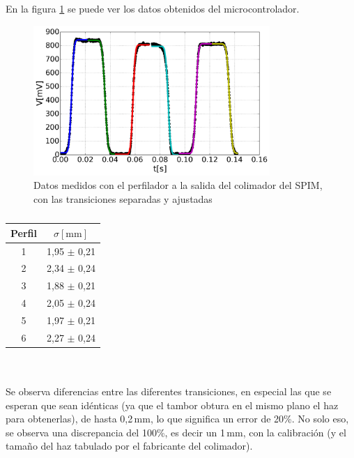 En la figura \ref{fig:perfilador/preliminar_fit} se puede ver los datos obtenidos del microcontrolador.

\begin{minipage}[c]{0.55\textwidth}
\begin{figure}[H]
    \centering
    \includegraphics[width=0.8\textwidth]{fig/perfilador/preliminar_fit}
    \caption{Datos medidos con el perfilador a la salida del colimador del SPIM, con las transiciones separadas y ajustadas}
    \label{fig:perfilador/preliminar_fit}
\end{figure}
\end{minipage}
\begin{minipage}[c]{0.35\textwidth}
    \begin{table}[H]
        \centering
        \begin{tabular}{c|c}
            Perfil & $\sigma[\text{mm}]$ \\ \hline
            1 & 1,95 $\pm$ 0,21 \\
            2 & 2,34 $\pm$ 0,24 \\
            3 & 1,88 $\pm$ 0,21 \\
            4 & 2,05 $\pm$ 0,24 \\
            5 & 1,97 $\pm$ 0,21 \\
            6 & 2,27 $\pm$ 0,24 \\
        \end{tabular}
        \caption{}
        \label{tbl:perfilador/preliminar_fit}
    \end{table}
\end{minipage}
\\ \\
Se observa diferencias entre las diferentes transiciones, en especial las que se esperan que sean idénticas (ya que el tambor obtura en el mismo plano el haz para obtenerlas), de hasta 0,2$\,$mm, lo que significa un error de 20\%. No solo eso, se observa una discrepancia del 100\%, es decir un 1$\,$mm, con la calibración (y el tamaño del haz tabulado por el fabricante del colimador). 


